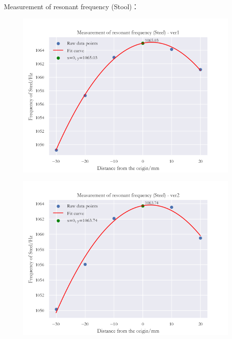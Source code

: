 \documentclass[UTF8]{article}
\begin{document}
   	 Measurement of resonant frequency (Stool)：
   	 \begin{figure}[H]
         \begin{minipage}[t]{0.33\linewidth}
            \centering
            \includegraphics[clip,scale=0.35,trim={0 0 0 0}]{fig/fig11.png}
            \label{figure.11}
         \end{minipage}
         \begin{minipage}[t]{0.33\linewidth}
            \centering
            \includegraphics[clip,scale=0.35,trim={0 0 0 0}]{fig/fig12.png}
            \label{figure.12}
         \end{minipage}  
         \begin{minipage}[t]{0.33\linewidth}

\end{minipage}
\end{figure}
\end{document}
